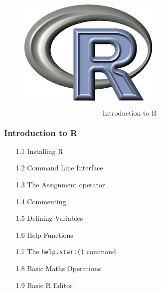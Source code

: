 \documentclass{beamer}
\begin{document}
 	\begin{frame}
 		\begin{figure}
 			\centering
 			\includegraphics[width=0.9\linewidth]{Rlogo}
 		\end{figure}
 		\[ \mbox{Introduction to R} \] 
 	\end{frame}
 	
 	
 	
 	\begin{frame}
 		\frametitle{Introduction to R}
 		\begin{itemize}
 			\item[1.1] Installing R      
 			\item[1.2] Command Line Interface     
 			\item[1.3] The Assignment operator     
 			\item[1.4] Commenting      
 			\item[1.5] Defining Variables     
 			\item[1.6] Help Functions      
 			\item[1.7] The \texttt{help.start()} command     
 			\item[1.8] Basic Maths Operations     
 			\item[1.9] Basic R Editor      
 		\end{itemize}
 	\end{frame}
 	
\end{document}
